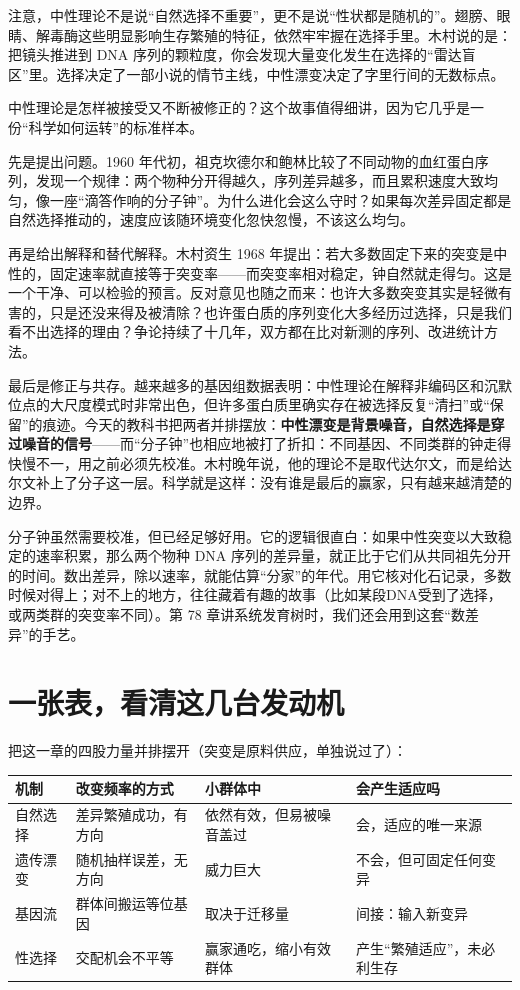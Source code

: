 注意，中性理论不是说“自然选择不重要”，更不是说“性状都是随机的”。翅膀、眼睛、解毒酶这些明显影响生存繁殖的特征，依然牢牢握在选择手里。木村说的是：把镜头推进到 DNA 序列的颗粒度，你会发现大量变化发生在选择的“雷达盲区”里。选择决定了一部小说的情节主线，中性漂变决定了字里行间的无数标点。

\begin{zhengju}
中性理论是怎样被接受又不断被修正的？这个故事值得细讲，因为它几乎是一份“科学如何运转”的标准样本。

先是提出问题。1960 年代初，祖克坎德尔和鲍林比较了不同动物的血红蛋白序列，发现一个规律：两个物种分开得越久，序列差异越多，而且累积速度大致均匀，像一座“滴答作响的分子钟”。为什么进化会这么守时？如果每次差异固定都是自然选择推动的，速度应该随环境变化忽快忽慢，不该这么均匀。

再是给出解释和替代解释。木村资生 1968 年提出：若大多数固定下来的突变是中性的，固定速率就直接等于突变率——而突变率相对稳定，钟自然就走得匀。这是一个干净、可以检验的预言。反对意见也随之而来：也许大多数突变其实是轻微有害的，只是还没来得及被清除？也许蛋白质的序列变化大多经历过选择，只是我们看不出选择的理由？争论持续了十几年，双方都在比对新测的序列、改进统计方法。

最后是修正与共存。越来越多的基因组数据表明：中性理论在解释非编码区和沉默位点的大尺度模式时非常出色，但许多蛋白质里确实存在被选择反复“清扫”或“保留”的痕迹。今天的教科书把两者并排摆放：\textbf{中性漂变是背景噪音，自然选择是穿过噪音的信号}——而“分子钟”也相应地被打了折扣：不同基因、不同类群的钟走得快慢不一，用之前必须先校准。木村晚年说，他的理论不是取代达尔文，而是给达尔文补上了分子这一层。科学就是这样：没有谁是最后的赢家，只有越来越清楚的边界。
\end{zhengju}

分子钟虽然需要校准，但已经足够好用。它的逻辑很直白：如果中性突变以大致稳定的速率积累，那么两个物种 DNA 序列的差异量，就正比于它们从共同祖先分开的时间。数出差异，除以速率，就能估算“分家”的年代。用它核对化石记录，多数时候对得上；对不上的地方，往往藏着有趣的故事（比如某段DNA受到了选择，或两类群的突变率不同）。第 78 章讲系统发育树时，我们还会用到这套“数差异”的手艺。

\section{一张表，看清这几台发动机}

把这一章的四股力量并排摆开（突变是原料供应，单独说过了）：

\begin{table}[htbp]
\centering
\begin{tabular}{llll}
\toprule
机制 & 改变频率的方式 & 小群体中 & 会产生适应吗 \\
\midrule
自然选择 & 差异繁殖成功，有方向 & 依然有效，但易被噪音盖过 & 会，适应的唯一来源 \\
遗传漂变 & 随机抽样误差，无方向 & 威力巨大 & 不会，但可固定任何变异 \\
基因流 & 群体间搬运等位基因 & 取决于迁移量 & 间接：输入新变异 \\
性选择 & 交配机会不平等 & 赢家通吃，缩小有效群体 & 产生“繁殖适应”，未必利生存 \\
\bottomrule
\end{tabular}
\end{table}


